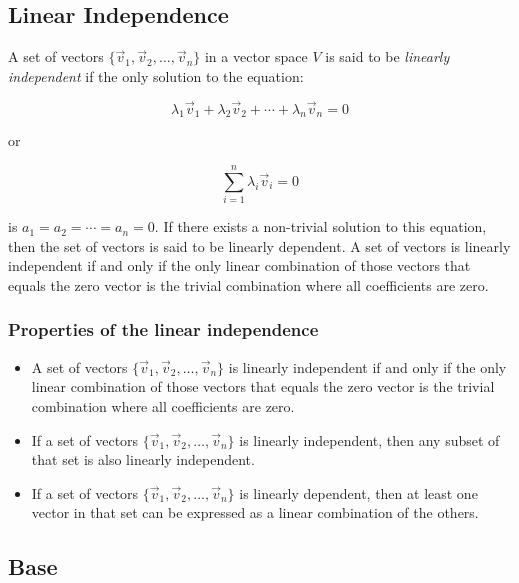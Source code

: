 \subsection{Linear Independence}

A set of vectors \(\{\vec{v}_1, \vec{v}_2, \dots, \vec{v}_n\}\) in a vector space \(V\) is said to 
be \emph{linearly independent} if the only solution to the equation:

\[
	\lambda_1\vec{v}_1 + \lambda_2\vec{v}_2 + \cdots + \lambda_n\vec{v}_n = 0
\]

or

\[
	\sum_{i=1}^n \lambda_i \vec{v}_i = 0
\]

is \(a_1 = a_2 = \cdots = a_n = 0\). If there exists a non-trivial solution to this equation, 
then the set of vectors is said to be linearly dependent. A set of vectors is linearly 
independent if and only if the only linear combination of those vectors that equals the zero vector 
is the trivial combination where all coefficients are zero.

\subsubsection{Properties of the linear independence}

\begin{itemize}

	\item A set of vectors \(\{\vec{v}_1, \vec{v}_2, \ldots, \vec{v}_n\}\) is linearly independent 
	      if and only if the only linear combination of those vectors that equals the zero vector is 
		  the trivial combination where all coefficients are zero.

	\item If a set of vectors \(\{\vec{v}_1, \vec{v}_2, \ldots, \vec{v}_n\}\) is linearly independent, 
	      then any subset of that set is also linearly independent.

	\item If a set of vectors \(\{\vec{v}_1, \vec{v}_2, \ldots, \vec{v}_n\}\) is linearly dependent, 
	      then at least one vector in that set can be expressed as a linear combination of the others.

\end{itemize}

\subsection{Base}


